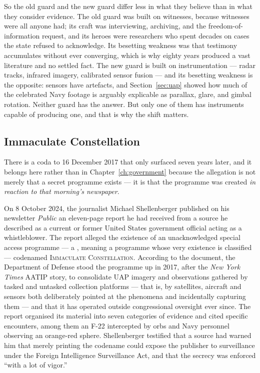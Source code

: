 So the old guard and the new guard differ less in what they believe than in what they consider
evidence. The old guard was built on witnesses, because witnesses were all anyone had; its craft was
interviewing, archiving, and the freedom-of-information request, and its heroes were researchers who
spent decades on cases the state refused to acknowledge. Its besetting weakness was that testimony
accumulates without ever converging, which is why eighty years produced a vast literature and no
settled fact. The new guard is built on instrumentation --- radar tracks, infrared imagery, calibrated
sensor fusion --- and its besetting weakness is the opposite: sensors have artefacts, and
Section~\ref{sec:uap} showed how much of the celebrated Navy footage is arguably explicable as
parallax, glare, and gimbal rotation. Neither guard has the answer. But only one of them has
instruments capable of producing one, and that is why the shift matters.

\subsection{Immaculate Constellation}\label{sec:immaculate}

There is a coda to 16 December 2017 that only surfaced seven years later, and it belongs here rather
than in Chapter~\ref{ch:government} because the allegation is not merely that a secret programme
exists --- it is that the programme was created \emph{in reaction to that morning's newspaper}.

On 8 October 2024, the journalist Michael Shellenberger published on his newsletter \emph{Public} an
eleven-page report he had received from a source he described as a current or former United States
government official acting as a whistleblower. The report alleged the existence of an unacknowledged
special access programme --- a , meaning a programme whose very existence is classified ---
codenamed \textsc{Immaculate Constellation}. According to the document, the Department of Defense stood
the programme up in 2017, after the \emph{New York Times} AATIP story, to consolidate UAP imagery and
observations gathered by tasked and untasked collection platforms --- that is, by satellites, aircraft
and sensors both deliberately pointed at the phenomena and incidentally capturing them --- and that it
has operated outside congressional oversight ever since. The report organised its material into seven
categories of evidence and cited specific encounters, among them an F-22 intercepted by orbs and Navy
personnel observing an orange-red sphere. Shellenberger testified that a source had warned him that
merely printing the codename could expose the publisher to surveillance under the Foreign Intelligence
Surveillance Act, and that the secrecy was enforced ``with a lot of vigor.''

